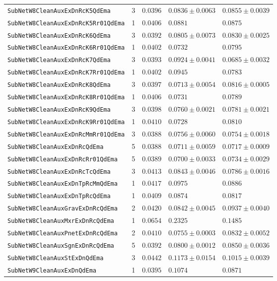 \begin{longtable}{lrlll}
\texttt{SubNetW8CleanAuxExDnRcK5QdEma} & 3 & $0.0396$ & $0.0836\pm0.0063$ & $0.0855\pm0.0039$\\
\texttt{SubNetW8CleanAuxExDnRcK5Rr01QdEma} & 1 & $0.0406$ & $0.0881$ & $0.0875$\\
\texttt{SubNetW8CleanAuxExDnRcK6QdEma} & 3 & $0.0392$ & $0.0805\pm0.0073$ & $0.0830\pm0.0025$\\
\texttt{SubNetW8CleanAuxExDnRcK6Rr01QdEma} & 1 & $0.0402$ & $0.0732$ & $0.0795$\\
\texttt{SubNetW8CleanAuxExDnRcK7QdEma} & 3 & $0.0393$ & $0.0924\pm0.0041$ & $0.0685\pm0.0032$\\
\texttt{SubNetW8CleanAuxExDnRcK7Rr01QdEma} & 1 & $0.0402$ & $0.0945$ & $0.0783$\\
\texttt{SubNetW8CleanAuxExDnRcK8QdEma} & 3 & $0.0397$ & $0.0713\pm0.0054$ & $0.0816\pm0.0005$\\
\texttt{SubNetW8CleanAuxExDnRcK8Rr01QdEma} & 1 & $0.0406$ & $0.0731$ & $0.0789$\\
\texttt{SubNetW8CleanAuxExDnRcK9QdEma} & 3 & $0.0398$ & $0.0760\pm0.0021$ & $0.0781\pm0.0021$\\
\texttt{SubNetW8CleanAuxExDnRcK9Rr01QdEma} & 1 & $0.0410$ & $0.0728$ & $0.0810$\\
\texttt{SubNetW8CleanAuxExDnRcMmRr01QdEma} & 3 & $0.0388$ & $0.0756\pm0.0060$ & $0.0754\pm0.0018$\\
\texttt{SubNetW8CleanAuxExDnRcQdEma} & 5 & $0.0388$ & $0.0711\pm0.0059$ & $0.0717\pm0.0009$\\
\texttt{SubNetW8CleanAuxExDnRcRr01QdEma} & 5 & $0.0389$ & $0.0700\pm0.0033$ & $0.0734\pm0.0029$\\
\texttt{SubNetW8CleanAuxExDnRcTcQdEma} & 3 & $0.0413$ & $0.0843\pm0.0046$ & $0.0786\pm0.0016$\\
\texttt{SubNetW8CleanAuxExDnTpRcMmQdEma} & 1 & $0.0417$ & $0.0975$ & $0.0886$\\
\texttt{SubNetW8CleanAuxExDnTpRcQdEma} & 1 & $0.0409$ & $0.0874$ & $0.0817$\\
\texttt{SubNetW8CleanAuxGravExDnRcQdEma} & 2 & $0.0420$ & $0.0842\pm0.0045$ & $0.0937\pm0.0040$\\
\texttt{SubNetW8CleanAuxMxrExDnRcQdEma} & 1 & $0.0654$ & $0.2325$ & $0.1485$\\
\texttt{SubNetW8CleanAuxPnetExDnRcQdEma} & 2 & $0.0410$ & $0.0755\pm0.0003$ & $0.0832\pm0.0052$\\
\texttt{SubNetW8CleanAuxSgnExDnRcQdEma} & 5 & $0.0392$ & $0.0800\pm0.0012$ & $0.0850\pm0.0036$\\
\texttt{SubNetW8CleanAuxStExDnQdEma} & 3 & $0.0442$ & $0.1173\pm0.0154$ & $0.1015\pm0.0039$\\
\texttt{SubNetW9CleanAuxExDnQdEma} & 1 & $0.0395$ & $0.1074$ & $0.0871$\\
\bottomrule
\end{longtable}
